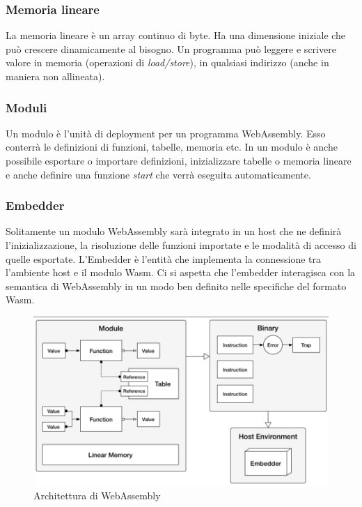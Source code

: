 \subsubsection{Memoria lineare}
La memoria lineare è un  array continuo di byte. Ha una dimensione iniziale che può crescere dinamicamente al bisogno. Un programma può leggere e scrivere valore in memoria (operazioni di \emph{load/store}), in qualsiasi indirizzo (anche in maniera non allineata).
\subsubsection{Moduli}
Un modulo è l'unità di deployment per un programma WebAssembly. Esso conterrà le definizioni di funzioni, tabelle, memoria etc. In un modulo è anche possibile esportare o importare definizioni, inizializzare tabelle o memoria lineare e anche definire una funzione \emph{start} che verrà eseguita automaticamente. 
\subsubsection{Embedder}
Solitamente un modulo WebAssembly sarà integrato in un host che ne definirà l'inizializzazione, la risoluzione delle funzioni importate  e le modalità di accesso di quelle esportate. L'Embedder è l'entità che implementa la connessione tra l'ambiente host e il modulo Wasm. Ci si aspetta che l'embedder interagisca con la semantica di WebAssembly in un modo ben definito nelle specifiche del formato Wasm.
\begin{figure}
        \begin{center}
                \includegraphics[width=0.9\columnwidth]{images/wasmArchitecture.png}
        \end{center}
        \caption{Architettura di WebAssembly}
        \label{fig:wasmArch}
\end{figure}

